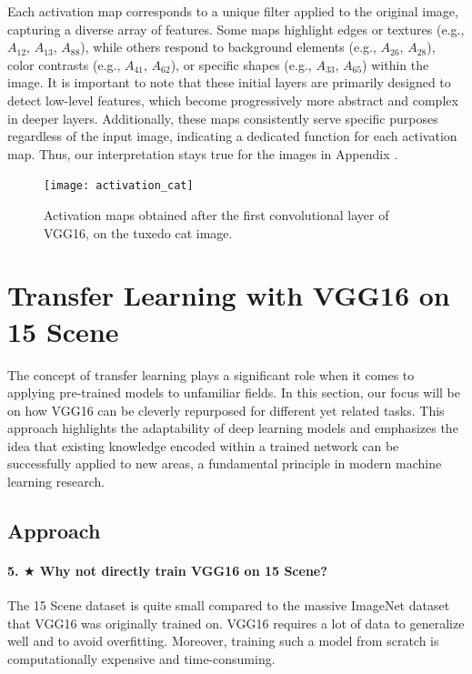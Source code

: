 Each activation map corresponds to a unique filter applied to the original image, capturing a diverse array of features. Some maps highlight edges or textures (e.g., $A_{12}$, $A_{13}$, $A_{88}$), while others respond to background elements (e.g., $A_{26}$, $A_{28}$), color contrasts (e.g., $A_{41}$, $A_{62}$), or specific shapes (e.g., $A_{33}$, $A_{65}$) within the image. It is important to note that these initial layers are primarily designed to detect low-level features, which become progressively more abstract and complex in deeper layers. Additionally, these maps consistently serve specific purposes regardless of the input image, indicating a dedicated function for each activation map. Thus, our interpretation stays true for the images in Appendix .

\begin{figure}[H]
    \centering
    \texttt{[image: activation\_cat]}
    \caption{Activation maps obtained after the first convolutional layer of VGG16, on the tuxedo cat image.}
    \label{fig:activation_cat}
\end{figure}

\section{Transfer Learning with VGG16 on 15 Scene}

The concept of transfer learning plays a significant role when it comes to applying pre-trained models to unfamiliar fields. In this section, our focus will be on how VGG16 can be cleverly repurposed for different yet related tasks. This approach highlights the adaptability of deep learning models and emphasizes the idea that existing knowledge encoded within a trained network can be successfully applied to new areas, a fundamental principle in modern machine learning research.

\subsection{Approach}
\paragraph{5. $\bigstar$ Why not directly train VGG16 on 15 Scene?}
The 15 Scene dataset is quite small compared to the massive ImageNet dataset that VGG16 was originally trained on. VGG16 requires a lot of data to generalize well and to avoid overfitting. Moreover, training such a model from scratch is computationally expensive and time-consuming.

